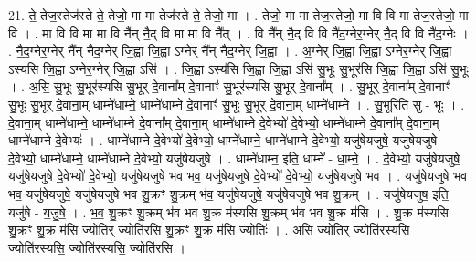 \documentclass[17pt]{extarticle}
\begin{document}
21. ते॒ तेज॒स्तेज॑स्ते ते॒ तेजो॒ मा मा तेज॑स्ते ते॒ तेजो॒ मा । . तेजो॒ मा मा तेज॒स्तेजो॒ मा वि वि मा तेज॒स्तेजो॒ मा वि । . मा वि वि मा मा वि नै᳚न् नै॒द् वि मा मा वि नै᳚त् । . वि नै᳚न् नै॒द् वि वि नै॑द॒ग्नेर॒ग्नेर् नै॒द् वि वि नै॑द॒ग्नेः । . नै॒द॒ग्नेर॒ग्नेर् नै᳚न् नैद॒ग्नेर् जि॒ह्वा जि॒ह्वा ऽग्नेर् नै᳚न् नैद॒ग्नेर् जि॒ह्वा । . अ॒ग्नेर् जि॒ह्वा जि॒ह्वा ऽग्नेर॒ग्नेर् जि॒ह्वा ऽस्य॑सि जि॒ह्वा ऽग्नेर॒ग्नेर् जि॒ह्वा ऽसि॑ । . जि॒ह्वा ऽस्य॑सि जि॒ह्वा जि॒ह्वा ऽसि॑ सु॒भूः सु॒भूर॑सि जि॒ह्वा जि॒ह्वा ऽसि॑ सु॒भूः । . अ॒सि॒ सु॒भूः सु॒भूर॑स्यसि सु॒भूर् दे॒वाना᳚म् दे॒वानाꣳ॑ सु॒भूर॑स्यसि सु॒भूर् दे॒वाना᳚म् । . सु॒भूर् दे॒वाना᳚म् दे॒वानाꣳ॑ सु॒भूः सु॒भूर् दे॒वाना॒म् धाम्ने॑धाम्ने॒ धाम्ने॑धाम्ने दे॒वानाꣳ॑ सु॒भूः सु॒भूर् दे॒वाना॒म् धाम्ने॑धाम्ने । . सु॒भूरिति॑ सु - भूः । . दे॒वाना॒म् धाम्ने॑धाम्ने॒ धाम्ने॑धाम्ने दे॒वाना᳚म् दे॒वाना॒म् धाम्ने॑धाम्ने दे॒वेभ्यो॑ दे॒वेभ्यो॒ धाम्ने॑धाम्ने दे॒वाना᳚म् दे॒वाना॒म् धाम्ने॑धाम्ने दे॒वेभ्यः॑ । . धाम्ने॑धाम्ने दे॒वेभ्यो॑ दे॒वेभ्यो॒ धाम्ने॑धाम्ने॒ धाम्ने॑धाम्ने दे॒वेभ्यो॒ यजु॑षेयजुषे॒ यजु॑षेयजुषे दे॒वेभ्यो॒ धाम्ने॑धाम्ने॒ धाम्ने॑धाम्ने दे॒वेभ्यो॒ यजु॑षेयजुषे । . धाम्ने॑धाम्न॒ इति॒ धाम्ने᳚ - धा॒म्ने॒ । . दे॒वेभ्यो॒ यजु॑षेयजुषे॒ यजु॑षेयजुषे दे॒वेभ्यो॑ दे॒वेभ्यो॒ यजु॑षेयजुषे भव भव॒ यजु॑षेयजुषे दे॒वेभ्यो॑ दे॒वेभ्यो॒ यजु॑षेयजुषे भव । . यजु॑षेयजुषे भव भव॒ यजु॑षेयजुषे॒ यजु॑षेयजुषे भव शु॒क्रꣳ शु॒क्रम् भ॑व॒ यजु॑षेयजुषे॒ यजु॑षेयजुषे भव शु॒क्रम् । . यजु॑षेयजुष॒ इति॒ यजु॑षे - य॒जु॒षे॒ । . भ॒व॒ शु॒क्रꣳ शु॒क्रम् भ॑व भव शु॒क्र म॑स्यसि शु॒क्रम् भ॑व भव शु॒क्र म॑सि । . शु॒क्र म॑स्यसि शु॒क्रꣳ शु॒क्र म॑सि॒ ज्योति॒र् ज्योति॑रसि शु॒क्रꣳ शु॒क्र म॑सि॒ ज्योतिः॑ । . अ॒सि॒ ज्योति॒र् ज्योति॑रस्यसि॒ ज्योति॑रस्यसि॒ ज्योति॑रस्यसि॒ ज्योति॑रसि । \newline
\end{document}
